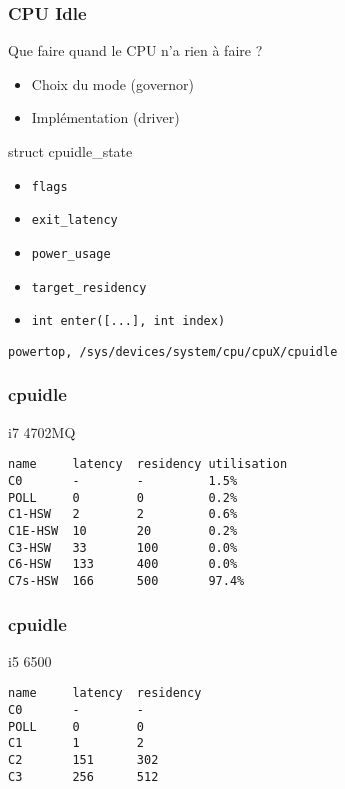 \begin{frame}
	\frametitle{CPU Idle}
	\begin{block}{Que faire quand le CPU n'a rien à faire ?}
	\begin{itemize}
		\item Choix du mode (governor)
		\item Implémentation (driver)
	\end{itemize}
	\end{block}
	\begin{block}{struct cpuidle\_state}
		\begin{itemize}
			\item \texttt{flags}
			\item \texttt{exit\_latency}
			\item \texttt{power\_usage}
			\item \texttt{target\_residency}
			\item \texttt{int enter([...], int index)}
		\end{itemize}
	\end{block}
	\texttt{powertop, /sys/devices/system/cpu/cpuX/cpuidle}
\end{frame}

\begin{frame}[fragile]
	\frametitle{cpuidle}
	\begin{block}{i7 4702MQ }
\begin{verbatim}
name     latency  residency utilisation
C0       -        -         1.5%
POLL     0        0         0.2%
C1-HSW   2        2         0.6%
C1E-HSW  10       20        0.2%
C3-HSW   33       100       0.0%
C6-HSW   133      400       0.0%
C7s-HSW  166      500       97.4%
\end{verbatim}
		\end{block}
\end{frame}

\begin{frame}[fragile]
	\frametitle{cpuidle}
	\begin{block}{i5 6500}
\begin{verbatim}
name     latency  residency
C0       -        -         
POLL     0        0         
C1       1        2         
C2       151      302       
C3       256      512       
\end{verbatim}
		\end{block}
\end{frame}


